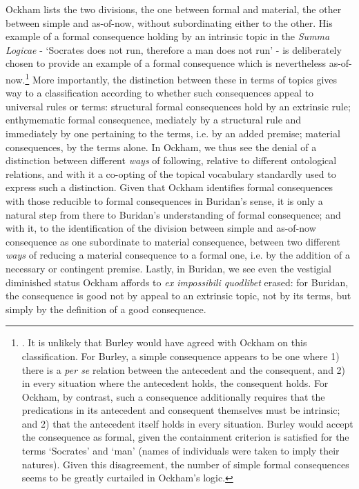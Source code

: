 \documentclass[]{article}
\begin{document}
		Ockham lists the two divisions, the one between formal and material, the other between simple and as-of-now, without subordinating either to the other. His example of a formal consequence holding by an intrinsic topic in the \textit{Summa Logicae} - `Socrates does not run, therefore a man does not run' - is deliberately chosen to provide an example of a formal consequence which is nevertheless as-of-now.\footnote{\cite[III-3. 1, p. 588]{OckhamSL}. It is unlikely that Burley would have agreed with Ockham on this classification. For Burley, a simple consequence appears to be one where 1) there is a \textit{per se} relation between the antecedent and the consequent, and 2) in every situation where the antecedent holds, the consequent holds. For Ockham, by contrast, such a consequence additionally requires that the predications in its antecedent and consequent themselves must be intrinsic; and 2) that the antecedent itself holds in every situation. Burley would accept the consequence as formal, given the containment criterion is satisfied for the terms `Socrates' and `man' (names of individuals were taken to imply their natures). Given this disagreement, the number of simple formal consequences seems to be greatly curtailed in Ockham's logic.} More importantly, the distinction between these in terms of topics gives way to a classification according to whether such consequences appeal to universal rules or terms: structural formal consequences hold by an extrinsic rule; enthymematic formal consequence, mediately by a structural rule and immediately by one pertaining to the terms, i.e. by an added premise; material consequences, by the terms alone. In Ockham, we thus see the denial of a distinction between different \textit{ways} of following, relative to different ontological relations, and with it a co-opting of the topical vocabulary standardly used to express such a distinction. Given that Ockham identifies formal consequences with those reducible to formal consequences in Buridan's sense, it is only a natural step from there to Buridan's understanding of formal consequence; and with it, to the identification of the division between simple and as-of-now consequence as one subordinate to material consequence, between two different \textit{ways} of reducing a material consequence to a formal one, i.e. by the addition of a necessary or contingent premise. Lastly, in Buridan, we see even the vestigial diminished status Ockham affords to \textit{ex impossibili quodlibet} erased: for Buridan, the consequence is good not by appeal to an extrinsic topic, not by its terms, but simply by the definition of a good consequence.
\end{document}
